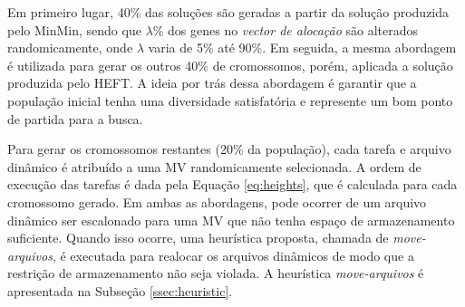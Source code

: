 Em primeiro lugar, 40\% das soluções são geradas a partir da solução produzida pelo MinMin, sendo que $\lambda\%$ dos genes no \textit{vector de alocação} são alterados randomicamente, onde $\lambda$ varia de 5\%  até 90\%. Em seguida, a mesma abordagem é utilizada para gerar os outros 40\% de cromossomos, porém, aplicada a solução produzida pelo HEFT. A ideia por trás dessa abordagem é garantir que a população inicial tenha uma diversidade satisfatória e represente um bom ponto de partida para a busca.



Para gerar os cromossomos restantes (20\% da população), cada tarefa e arquivo dinâmico é atribuído a uma MV randomicamente selecionada. A ordem de execução das tarefas é dada pela Equação \ref{eq:heights}, que é calculada para cada cromossomo gerado. Em ambas as abordagens, pode ocorrer de um arquivo dinâmico ser escalonado para uma MV que não tenha espaço de armazenamento suficiente. Quando isso ocorre, uma heurística proposta, chamada de \textit{move-arquivos}, é executada para realocar os arquivos dinâmicos de modo que a restrição de armazenamento não seja violada. A heurística \textit{move-arquivos} é apresentada na Subseção \ref{ssec:heuristic}.


